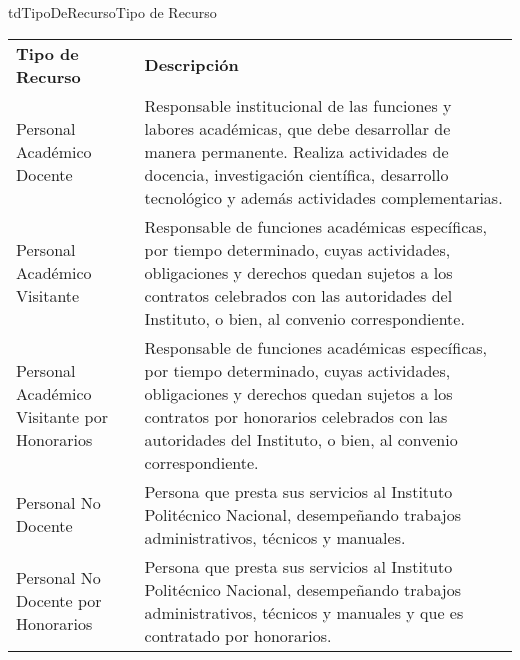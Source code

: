 \begin{TipoDeDato}{tdTipoDeRecurso}{Tipo de Recurso}
		\begin{longtable}{| p{}| p{}|}
	 			\rowcolor{colorPrincipal}
	 			\multicolumn{2}{|c|}{\bf \color{white} Valores Iniciales}\\
	 			\hline
	 			\rowcolor{colorSecundario}
	 			\bf \color{white} Tipo de Recurso & \bf \color{white}  Descripción \\
	 			\hline
	 			\endhead
	 			\hline
	 			Personal Académico Docente & Responsable institucional de las funciones y labores académicas, que debe desarrollar de manera permanente. Realiza actividades de docencia, investigación científica, desarrollo tecnológico y además actividades complementarias.\\
	 			\hline
	 			Personal Académico Visitante & Responsable de funciones académicas específicas, por tiempo determinado, cuyas actividades, obligaciones y derechos quedan sujetos a los contratos celebrados con las autoridades del Instituto, o bien, al convenio correspondiente. \\
	 			\hline
	 			Personal Académico Visitante por Honorarios & Responsable de funciones académicas específicas, por tiempo determinado, cuyas actividades, obligaciones y derechos quedan sujetos a los contratos por honorarios celebrados con las autoridades del Instituto, o bien, al convenio correspondiente.\\
	 			\hline
	 			Personal No Docente & Persona que presta sus servicios al Instituto Politécnico Nacional, desempeñando trabajos administrativos, técnicos y manuales.\\
	 			\hline
	 			Personal No Docente por Honorarios & Persona que presta sus servicios al Instituto Politécnico Nacional, desempeñando trabajos administrativos, técnicos y manuales y que es contratado por honorarios.\\
	 			\hline
	 		\end{longtable}
	\end{TipoDeDato}
	

